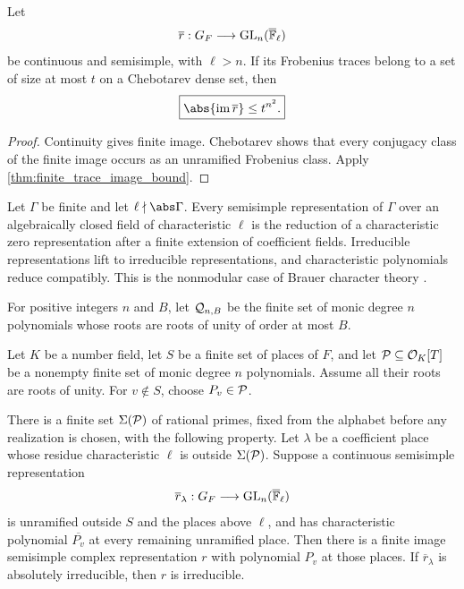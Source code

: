 \begin{corollary}\label{cor:residual_image_bound}
Let
\[
 \overline r:G_F\longrightarrow\operatorname{GL}_n(\overline{\mathbb F}_{\ell})
\]
be continuous and semisimple, with \(\ell>n\). If its Frobenius traces belong to a set of size at most \(t\) on a Chebotarev dense set, then
\[
\boxed{
 \abs{\im\overline r}\leq t^{n^2}.
}
\]
\end{corollary}

\begin{proof}
Continuity gives finite image. Chebotarev shows that every conjugacy class of the finite image occurs as an unramified Frobenius class. Apply \cref{thm:finite_trace_image_bound}.
\end{proof}

\begin{standardfact}\label{fact:cross_characteristic_lifting}
Let \(\Gamma\) be finite and let \(\ell\nmid\abs\Gamma\). Every semisimple representation of \(\Gamma\) over an algebraically closed field of characteristic \(\ell\) is the reduction of a characteristic zero representation after a finite extension of coefficient fields. Irreducible representations lift to irreducible representations, and characteristic polynomials reduce compatibly. This is the nonmodular case of Brauer character theory \cite{BrauerNesbitt1941,CurtisReiner1962,Serre1977}.
\end{standardfact}

\begin{definition}\label{def:bounded_cyclotomic_alphabet}
For positive integers \(n\) and \(B\), let \(\mathcal Q_{n,B}\) be the finite set of monic degree \(n\) polynomials whose roots are roots of unity of order at most \(B\).
\end{definition}

\begin{theorem}\label{thm:large_residual_realization}
Let \(K\) be a number field, let \(S\) be a finite set of places of \(F\), and let \(\mathcal P\subseteq\mathcal O_K[T]\) be a nonempty finite set of monic degree \(n\) polynomials. Assume all their roots are roots of unity. For \(v\notin S\), choose \(P_v\in\mathcal P\).

There is a finite set \(\Sigma(\mathcal P)\) of rational primes, fixed from the alphabet before any realization is chosen, with the following property. Let \(\lambda\) be a coefficient place whose residue characteristic \(\ell\) is outside \(\Sigma(\mathcal P)\). Suppose a continuous semisimple representation
\[
 \overline r_\lambda:G_F\longrightarrow\operatorname{GL}_n(\overline{\mathbb F}_\ell)
\]
is unramified outside \(S\) and the places above \(\ell\), and has characteristic polynomial \(\overline{P_v}\) at every remaining unramified place. Then there is a finite image semisimple complex representation \(r\) with polynomial \(P_v\) at those places. If \(\overline r_\lambda\) is absolutely irreducible, then \(r\) is irreducible.
\end{theorem}

